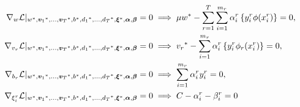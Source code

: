\begin{align}
    \grad_{{w}} \lagr \vert_{\optim{{w}}, \optim{\fv{v}_1}, \ldots, \optim{\fv{v}_\ntasks}, \optim{b}, \optim{d_1}, \ldots, \optim{d_\ntasks}, \optim{\fv{\xi}}, {\fv{\alpha}}, {\fv{\beta}}} = 0  &\implies \mu \optim{{w}} - \sum_{r= 1}^T \sum_{i=1}^{m_r} {\alpha_i^r} \left\lbrace y_i^r \phi(x_i^r) \right\rbrace = 0 , \label{eq:common_repr_add} \\
    \grad_{{v}_r} \lagr \vert_{\optim{{w}}, \optim{\fv{v}_1}, \ldots, \optim{\fv{v}_\ntasks}, \optim{b}, \optim{d_1}, \ldots, \optim{d_\ntasks}, \optim{\fv{\xi}}, {\fv{\alpha}}, {\fv{\beta}}} = 0 &\implies \optim{{v}_r} - \sum_{i=1}^{m_r} {\alpha_i^r} \left\lbrace y_i^r \phi_r(x_i^r) \right\rbrace = 0 , \label{eq:specific_repr_add} \\
    \grad_{b_r} \lagr \vert_{\optim{{w}}, \optim{\fv{v}_1}, \ldots, \optim{\fv{v}_\ntasks}, \optim{b}, \optim{d_1}, \ldots, \optim{d_\ntasks}, \optim{\fv{\xi}}, {\fv{\alpha}}, {\fv{\beta}}} = 0 &\implies \sum_{i=1}^{m_r} {\alpha_i^r} y_i^r = 0 , \label{eq:specific_eqconstr_add} \\
    \grad_{\xi_i^r} \lagr \vert_{\optim{{w}}, \optim{\fv{v}_1}, \ldots, \optim{\fv{v}_\ntasks}, \optim{b}, \optim{d_1}, \ldots, \optim{d_\ntasks}, \optim{\fv{\xi}}, {\fv{\alpha}}, {\fv{\beta}}} = 0 &\implies C - {\alpha_i^r} - {\beta_i^r} = 0 \label{eq:xi_feas_add}
\end{align}

